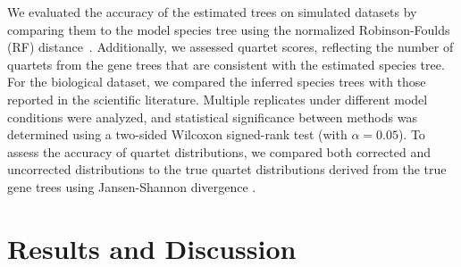 \documentclass[runningheads]{llncs}
\begin{document}
We evaluated the accuracy of the estimated trees on simulated datasets by comparing them to the model species tree using the normalized Robinson-Foulds (RF) distance~\cite{robinson_comparison_1981}.%
Additionally, we assessed quartet scores, reflecting the number of quartets from the gene trees that are consistent with the estimated species tree. %
For the biological dataset, we compared the inferred species trees with those reported in the scientific literature. Multiple replicates under different model conditions were analyzed, and statistical significance between methods was determined using a two-sided Wilcoxon signed-rank test (with $\alpha = 0.05$). To assess the accuracy of quartet distributions, we compared both corrected and uncorrected distributions to the true quartet distributions derived from the true gene trees using Jansen-Shannon divergence \cite{fuglede2004jensen}.


\section{Results and Discussion}
\end{document}
